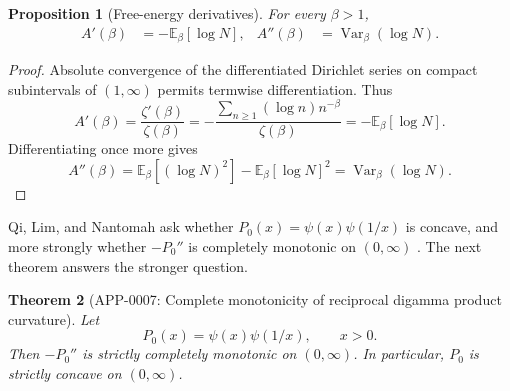 \documentclass[11pt]{article}
\numberwithin{equation}{section}
\newtheorem{theorem}{Theorem}[section]
\newtheorem{proposition}[theorem]{Proposition}
\theoremstyle{definition}
\theoremstyle{remark}
\DeclareMathOperator{\Var}{Var}
\newcommand{\E}{\mathbb E}
\newcommand{\1}{\mathbf 1}
\begin{document}
\begin{proposition}[Free-energy derivatives]
\label{prop:free-energy-derivatives}
For every \(\beta>1\),
\begin{align}
\label{eq:free-energy-derivatives}
A'(\beta)&=-\E_\beta[\log N],&
A''(\beta)&=\Var_\beta(\log N).
\end{align}
\end{proposition}

\begin{proof}
Absolute convergence of the differentiated Dirichlet series on compact subintervals of \((1,\infty)\) permits termwise differentiation.  Thus
\begin{equation}
\label{eq:first-free-derivative-proof}
A'(\beta)=\frac{\zeta'(\beta)}{\zeta(\beta)}
=-\frac{\sum_{n\ge1}(\log n)n^{-\beta}}{\zeta(\beta)}
=-\E_\beta[\log N].
\end{equation}
Differentiating once more gives
\begin{equation}
\label{eq:second-free-derivative-proof}
A''(\beta)=\E_\beta[(\log N)^2]-\E_\beta[\log N]^2
=\Var_\beta(\log N).
\end{equation}
\end{proof}

Qi, Lim, and Nantomah ask whether \(P_0(x)=\psi(x)\psi(1/x)\) is concave, and more strongly whether \(-P_0''\) is completely monotonic on \((0,\infty)\) \cite{qi-lim-nantomah-polygamma}.  The next theorem answers the stronger question.

\begin{theorem}[APP-0007: Complete monotonicity of reciprocal digamma product curvature]
\label{thm:reciprocal-digamma-product-complete-monotonicity}
Let
\begin{equation}
\label{eq:reciprocal-digamma-p0}
P_0(x)=\psi(x)\psi(1/x),\qquad x>0.
\end{equation}
Then \(-P_0''\) is strictly completely monotonic on \((0,\infty)\).  In particular, \(P_0\) is strictly concave on \((0,\infty)\).
\end{theorem}
\end{document}

